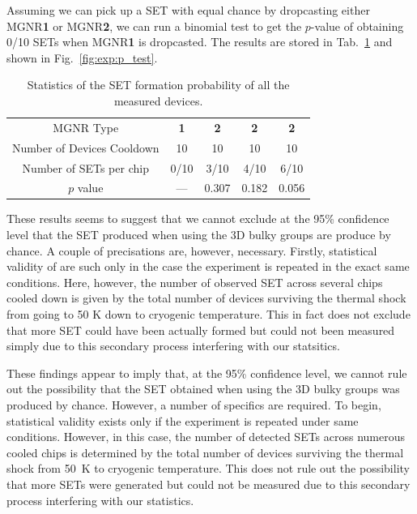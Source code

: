 Assuming we can pick up a SET with equal chance by dropcasting either \gls{MGNR}\textbf{1} or \gls{MGNR}\textbf{2}, we can run a binomial test to get the $p$-value of obtaining 0/10 \glspl{SET} when \gls{MGNR}\textbf{1} is dropcasted. The results are stored in Tab.~\ref{tab:p_values} and shown in Fig.~\ref{fig:exp:p_test}.

\begin{table}
    \caption{\label{tab:p_values} Statistics of the SET formation probability of all the measured devices.}
    \centering
    \begin{tabular}{ccccc}
        \hline MGNR Type           & \textbf{1} & \textbf{2} & \textbf{2} & \textbf{2}                           \\
        Number of Devices Cooldown & 10         & 10         & 10         & 10                                \T \\
        Number of SETs per chip    & 0/10       & 3/10       & 4/10       & 6/10                                 \\
        $p$ value                  & ---        & 0.307      & 0.182      & 0.056                                \\
        \hline
    \end{tabular}
\end{table}

These results seems to suggest that we cannot exclude at the 95\% confidence level that the SET produced when using the 3D bulky groups are produce by chance. A couple of precisations are, however, necessary. Firstly, statistical validity of are such only in the case the experiment is repeated in the exact same conditions. Here, however, the number of observed SET across several chips cooled down is given by the total number of devices surviving the thermal shock from going to 50 K down to cryogenic temperature. This in fact does not exclude that more SET could have been actually formed but could not been measured simply due to this secondary process interfering with our statsitics.

These findings appear to imply that, at the 95\% confidence level, we cannot rule out the possibility that the SET obtained when using the 3D bulky groups was produced by chance. However, a number of specifics are required. To begin, statistical validity exists only if the experiment is repeated under same conditions. However, in this case, the number of detected \glspl{SET} across numerous cooled chips is determined by the total number of devices surviving the thermal shock from \SI{50}{\kelvin} to cryogenic temperature. This does not rule out the possibility that more \glspl{SET} were generated but could not be measured due to this secondary process interfering with our statistics.

